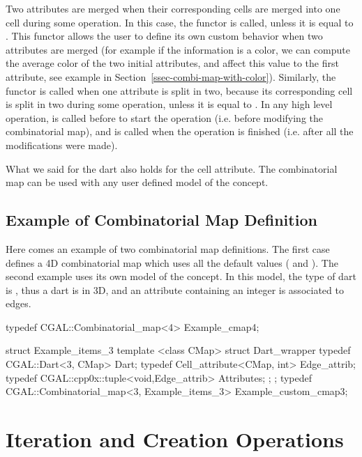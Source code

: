 Two attributes are merged when their corresponding cells are merged
into one cell during some operation. In this case, the functor
 is called, unless it is equal to .
This functor allows the user to define its own custom behavior when
two attributes are merged (for example if the information is a color,
we can compute the average color of the two initial attributes, and
affect this value to the first attribute, see example in
Section~\ref{ssec-combi-map-with-color}).  Similarly, the functor
 is called when one attribute is split in two, because
its corresponding cell is split in two during some operation, unless
it is equal to .  In any high level operation,
 is called before to start the operation (i.e. before
modifying the combinatorial map), and  is called when the
operation is finished (i.e. after all the modifications were made).

What we said for the dart also holds for the cell attribute.  The
combinatorial map can be used with any user defined model of the 
 concept.

\subsection{Example of Combinatorial Map Definition}\label{ssec-example-def}

Here comes an example of two combinatorial map definitions.  The first
case  defines a 4D combinatorial map which uses all
the default values ( and
). The second example
 uses its own model of the
 concept. In this model, the type
of dart is , thus a dart is in 3D, and an
attribute containing an integer is associated to edges.

\begin{ccExampleCode}
typedef CGAL::Combinatorial_map<4> Example_cmap4;

struct Example_items_3
{
   template <class CMap>
   struct Dart_wrapper
   {
     typedef CGAL::Dart<3, CMap> Dart;
     typedef Cell_attribute<CMap, int> Edge_attrib;
     typedef CGAL::cpp0x::tuple<void,Edge_attrib> Attributes;
   };
};
typedef CGAL::Combinatorial_map<3, Example_items_3> Example_custom_cmap3;
\end{ccExampleCode}


\section{Iteration and Creation Operations}

